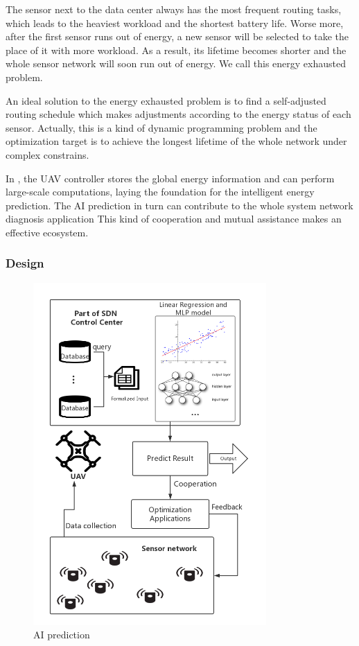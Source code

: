 The sensor next to the data center always has the most frequent routing tasks, which leads to
the heaviest workload and the shortest battery life. Worse more, after the
first sensor runs out of energy, a new sensor will be selected to take the place 
of it with more workload. As a result, its lifetime becomes shorter and the whole 
sensor network will soon run out of energy. We call this energy exhausted problem.

An ideal solution to the energy exhausted problem is to find a self-adjusted routing schedule which 
makes adjustments according to the energy status of each sensor. 
Actually, this is a kind of dynamic programming problem and
the optimization target is to achieve the longest lifetime of the whole network under
complex constrains. 

In {\sdn}, the UAV controller stores the global energy information 
and can perform large-scale computations, laying 
the foundation for the intelligent energy prediction.
The AI prediction in turn can contribute to the whole system  network diagnosis application
This kind of cooperation and mutual assistance makes {\sdn} an effective ecosystem.



\subsubsection{Design}

\begin{figure}[htbp]
	\centering
	\includegraphics[width=3.5in]{Figure/SDWN-AIprediction}
	\caption{AI prediction}
	\label{prediction}
\end{figure}

